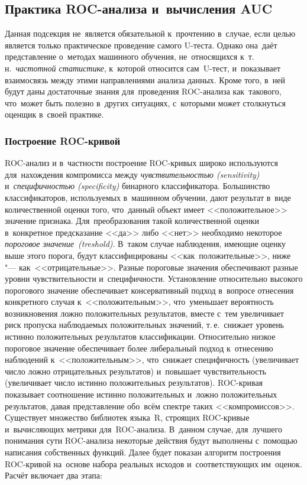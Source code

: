 \documentclass[]{scrreprt}
\begin{document}
\subsection{Практика ROC-анализа и~вычисления AUC}\label{ROC-AUC-theory}
Данная подсекция не~является обязательной к~прочтению в~случае, если целью является только практическое проведение самого U-теста. Однако она~даёт представление о~методах машинного обучения, не~относящихся к~т.\,н.~\emph{частотной статистике}, к~которой относится сам~U-тест, и~показывает взаимосвязь между этими направлениями анализа данных. Кроме того, в~ней будут даны достаточные знания для~проведения ROC-анализа как~такового, что~может быть полезно в~других ситуациях, с~которыми может столкнуться оценщик в~своей практике.
\subsubsection{Построение ROC-кривой}\label{plot-ROC-theory}
%
%
ROC-анализ и в~частности построение ROC-кривых широко используются для~нахождения компромисса между \emph{чувствительностью (\foreignlanguage{english}{sensitivity})} и~\emph{специфичностью (\foreignlanguage{english}{specificity})} бинарного классификатора. Большинство классификаторов, используемых в~машинном обучении, дают результат в~виде количественной оценки того, что~данный объект имеет <<положительное>> значение признака. Для~преобразования такой количественной оценки в~конкретное предсказание <<да>> либо <<нет>> необходимо некоторое \emph{пороговое значение~(\foreignlanguage{english}{treshold})}. В~таком случае наблюдения, имеющие оценку выше этого порога, будут классифицированы <<как~положительные>>, ниже "--- как~<<отрицательные>>. Разные пороговые значения обеспечивают разные уровни чувствительности и~специфичности. Установление относительно высокого порогового значение обеспечивает консервативный подход в~вопросе отнесения конкретного случая к~<<положительным>>, что~уменьшает вероятность возникновения ложно положительных результатов, вместе с~тем увеличивает риск пропуска наблюдаемых положительных значений, т.\,е.~снижает уровень истинно положительных результатов классификации. Относительно низкое пороговое значение обеспечивает более либеральный подход к~отнесению наблюдений к~<<положительным>>, что~снижает специфичность  (увеличивает число ложно отрицательных результатов) и~повышает чувствительность (увеличивает число истинно положительных результатов). ROC-кривая показывает соотношение истинно положительных и~ложно положительных результатов, давая представление обо~всём спектре таких <<компромиссов>>. Существует множество библиотек языка~R, строящих ROC-кривые и~вычисляющих метрики для~ROC-анализа. В~данном случае, для~лучшего понимания сути ROC-анализа некоторые действия будут выполнены с~помощью написания собственных функций. Далее будет показан алгоритм построения ROC-кривой на~основе набора реальных исходов и~соответствующих им~оценок. Расчёт включает два этапа:
\end{document}
